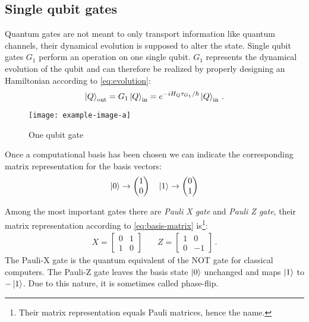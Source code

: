 \subsection{Single qubit gates}
Quantum gates are not meant to only transport information like quantum channels, their dynamical evolution is supposed to alter the state.
Single qubit gates $G_1$ perform an operation on one single qubit. $G_1$ represents the dynamical evolution of the qubit and can therefore be realized by properly designing an Hamiltonian according to \eqref{eq:evolution}:
\begin{equation*}
   \ket{Q}_\textup{out} = G_1\ket{Q}_\textup{in} = e^{-iH_Q \tau_{G_1}/\hbar}\ket{Q}_\textup{in}\,.
\end{equation*}
\begin{figure}
\centering
\texttt{[image: example-image-a]}
\caption{One qubit gate}
\label{fig:single-qubit-gate}
\end{figure}


Once a computational basis has been chosen we can indicate the corresponding matrix representation for the basis vectors:
\begin{equation}\label{eq:basis-matrix}
    \ket{0} \rightarrow \begin{pmatrix} 1 \\ 0 \end{pmatrix} \quad \ket{1} \rightarrow \begin{pmatrix} 0 \\ 1 \end{pmatrix}
\end{equation}

Among the most important gates there are \emph{Pauli X gate} and \emph{Pauli Z gate}, their matrix representation according to \ref{eq:basis-matrix} is\footnote{Their matrix representation equals Pauli matrices, hence the name.}:
\begin{align*}
    X = 
    \begin{bmatrix}
    0 & 1\\
    1 & 0
    \end{bmatrix} 
    \quad &
     Z = 
    \begin{bmatrix}
    1 & 0\\
    0 & -1
    \end{bmatrix}\,.
\end{align*}
The Pauli-X gate is the quantum equivalent of the NOT gate for classical computers. 
The Pauli-Z gate leaves the basis state $\ket{0}$  unchanged and maps $\ket{1}$  to $-\ket{1}$. Due to this nature, it is sometimes called phase-flip. 
